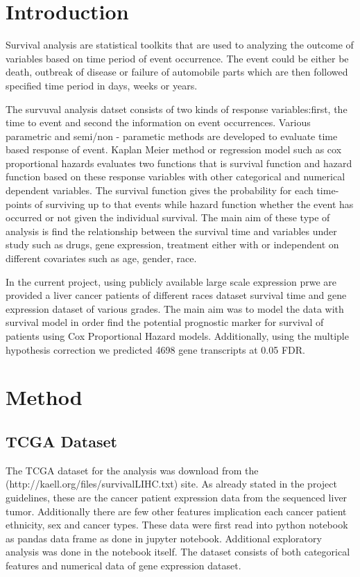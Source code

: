 \documentclass{article}
\title{\vspace{-4cm}{TCGA Liver cancer survival analysis of expressed gene transcript}}
\author{ Sailendra Pradhananga (sailendra.pradhanaga@scilifelab.se)\\ 
			Project Report:Algorithms in Bioinformatics\\ 
			KTH Royal Institute Of Technology}
\begin{document}
\maketitle

\section{Introduction}

Survival analysis are statistical toolkits that are used to analyzing the outcome of variables based on time period of event occurrence. The event could be either be death, outbreak of disease or failure of automobile parts which are then followed specified time period in days, weeks or years. 

The survuval analysis datset consists of two kinds of response variables:first, the time to event and second the information on event occurrences. Various parametric and semi/non - parametic methods are developed to evaluate time based response of event. Kaplan Meier method or regression model such as cox proportional hazards evaluates two functions that is  survival function and hazard function  based on these response variables with other categorical and numerical dependent variables. The survival function gives the probability  for each time-points of surviving up to that events while hazard function whether the event has occurred or not  given the individual survival. The main aim of these type of analysis is find the relationship between the survival time and variables under study such as drugs, gene expression, treatment either with or independent on different covariates such as age, gender, race.

In the current project, using publicly available large scale expression prwe are provided a liver cancer patients of different races  dataset survival time and gene expression dataset of various grades. The main aim was to model the data with survival model in order find the potential prognostic marker for survival of patients using Cox Proportional Hazard models. Additionally, using the multiple hypothesis correction we predicted 4698 gene transcripts at 0.05 FDR. 

\section{Method}

	\subsection{TCGA Dataset}
The  TCGA dataset for the analysis was download from the (http://kaell.org/files/survivalLIHC.txt) site. As already stated in the project guidelines, these are the cancer patient expression data from the sequenced liver tumor.  Additionally there are few other features implication each cancer patient ethnicity, sex and cancer types.  These data were first read into python notebook as pandas data frame  as done in  jupyter notebook.  Additional exploratory analysis was done in the notebook itself. The  dataset consists of both categorical features and numerical data of gene expression dataset. 
\end{document}
